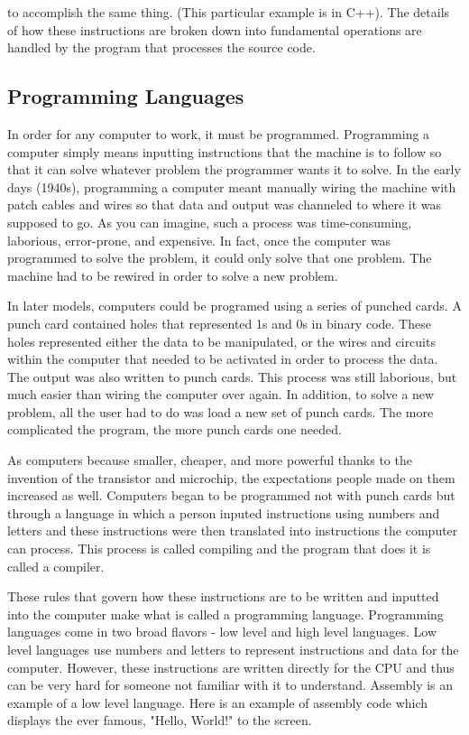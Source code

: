 	
	
	to accomplish the same thing. (This particular example is in C++). The details of how these instructions are broken down into fundamental operations are handled by the program that processes the source code.
\subsection*{Programming Languages}

In order for any computer to work, it must be programmed. Programming a computer simply means inputting instructions that the machine is to follow so that it can solve whatever problem the programmer wants it to solve. In the early days (1940s), programming a computer meant manually wiring the machine with patch cables and wires so that data and output was channeled to where it was supposed to go. As you can imagine, such a process was time-consuming, laborious, error-prone, and expensive. In fact, once the computer was programmed to solve the problem, it could only solve that one problem. The machine had to be rewired in order to solve a new problem.

In later models, computers could be programed using a series of punched cards. A punch card contained holes that represented 1s and 0s in binary code. These holes represented either the data to be manipulated, or the wires and circuits within the computer that needed to be activated in order to process the data. The output was also written to punch cards.  This process was still laborious, but much easier than wiring the computer over again. In addition, to solve a new problem, all the user had to do was load a new set of punch cards. The more complicated the program, the more punch cards one needed. 

As computers because smaller, cheaper, and more powerful thanks to the invention of the transistor and microchip, the expectations people made on them increased as well. Computers began to be programmed not with punch cards but through a language in which a person inputed instructions using numbers and letters and these instructions were then translated into instructions the computer can process. This process is called compiling and the program that does it is called a compiler.

These rules that govern how these instructions are to be written and inputted into the computer make what is called a programming language. Programming languages come in two broad flavors - low level and high level languages. Low level languages use numbers and letters to represent instructions and data for the computer. However, these instructions are written directly for the CPU and thus can be very hard for someone not familiar with it to understand. Assembly is an example of a low level language. Here is an example of assembly code which displays the ever famous, "Hello, World!" to the screen.


